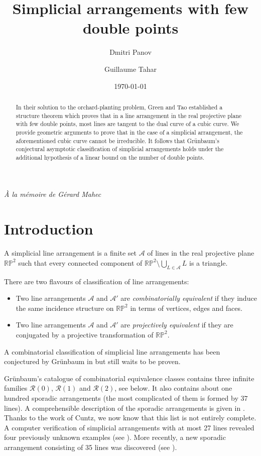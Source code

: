 \documentclass[a4paper,11pt,reqno]{amsart}
\title{Simplicial arrangements with few double points}
\author{Dmitri Panov}
\author[G.~Tahar]{Guillaume Tahar}
\date{\today}
\theoremstyle{definition}
\theoremstyle{remark}
\theoremstyle{definition}
\theoremstyle{definition}
\theoremstyle{definition}
\numberwithin{equation}{section}
\begin{document}
%

\begin{abstract}
In their solution to the orchard-planting problem, Green and Tao established a structure theorem which proves that in a line arrangement in the real projective plane with few double points, most lines are tangent to the dual curve of a cubic curve. We provide geometric arguments to prove that in the case of a simplicial arrangement, the aforementioned cubic curve cannot be irreducible. It follows that Gr\"{u}nbaum's conjectural asymptotic classification of simplicial arrangements holds under the additional hypothesis of a linear bound on the number of double points.
\end{abstract}
%
%
\maketitle
\setcounter{tocdepth}{1}
%
\begin{center}
\textit{\`{A} la mémoire de Gérard Mahec}
\end{center}

\tableofcontents

\section{Introduction}

A simplicial line arrangement is a finite set $\mathcal{A}$ of lines in the real projective plane $\mathbb{RP}^{2}$ such that every connected component of $\mathbb{RP}^{2} \setminus \bigcup\limits_{L \in \mathcal{A}} L$ is a triangle.
\par
There are two flavours of classification of line arrangements:
\begin{itemize}
    \item Two line arrangements $\mathcal{A}$ and $\mathcal{A}'$ are \textit{combinatorially equivalent} if they induce the same incidence structure on $\mathbb{RP}^{2}$ in terms of vertices, edges and faces.
    \item Two line arrangements $\mathcal{A}$ and $\mathcal{A}'$ are \textit{projectively equivalent} if they are conjugated by a projective transformation of $\mathbb{RP}^{2}$.
\end{itemize}

A combinatorial classification of simplicial line arrangements has been conjectured by Gr\"{u}nbaum in \cite{Gr} but still waits to be proven.
\par
Gr\"{u}nbaum's catalogue of combinatorial equivalence classes contains three infinite families $\mathcal{R}(0)$, $\mathcal{R}(1)$ and $\mathcal{R}(2)$, see below. It also contains about one hundred sporadic arrangements (the most complicated of them is formed by $37$ lines). A comprehensible description of the sporadic arrangements is given in \cite{Gr1}. Thanks to the work of Cuntz, we now know that this list is not entirely complete. A computer verification of simplicial arrangements with at most 27 lines revealed four previously unknown examples (see \cite{Cu1}). More recently, a new sporadic arrangement consisting of 35 lines was discovered (see \cite{Cu2}).
\end{document}
